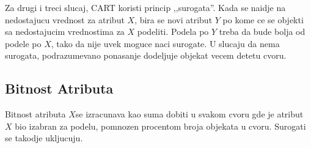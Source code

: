 \documentclass[a4paper]{article}
\begin{document}
Za drugi i treci slucaj, CART koristi princip ,,surogata''. Kada se naidje na nedostajucu vrednost
za atribut \(X\), bira se novi atribut \(Y\) po kome ce se objekti sa nedostajucim vrednostima za
\(X\) podeliti. Podela po \(Y\) treba da bude bolja od podele po \(X\), tako da nije uvek moguce
naci surogate. U slucaju da nema surogata, podrazumevano ponasanje dodeljuje objekat vecem detetu
cvoru.

\subsection{Bitnost Atributa}
Bitnost atributa \(X\)se izracunava kao suma dobiti u svakom cvoru gde je atribut \(X\) bio izabran
za podelu, pomnozen procentom broja objekata u cvoru. Surogati se takodje ukljucuju.
\end{document}
